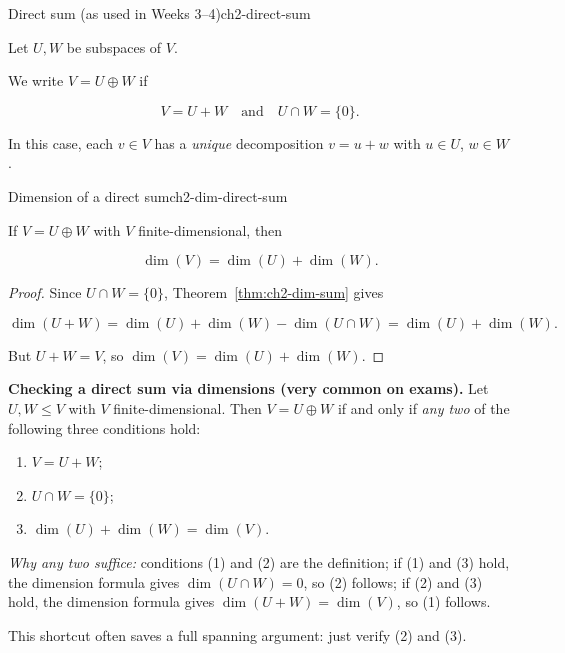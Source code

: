\begin{definition}{Direct sum (as used in Weeks 3--4)}{ch2-direct-sum}

Let $U,W$ be subspaces of $V$.

We write $V=U\oplus W$ if

\[
V=U+W
\quad\text{and}\quad
U\cap W=\{0\}.
\]

In this case, each $v\in V$ has a \emph{unique} decomposition $v=u+w$ with $u\in U$, $w\in W$.

\end{definition}

\begin{theorem}{Dimension of a direct sum}{ch2-dim-direct-sum}

If $V=U\oplus W$ with $V$ finite-dimensional, then

\[
\dim(V)=\dim(U)+\dim(W).
\]

\begin{proof}

Since $U\cap W=\{0\}$, Theorem~\ref{thm:ch2-dim-sum} gives

\[
\dim(U+W)=\dim(U)+\dim(W)-\dim(U\cap W)=\dim(U)+\dim(W).
\]

But $U+W=V$, so $\dim(V)=\dim(U)+\dim(W)$.

\end{proof}

\end{theorem}

\begin{keyformula}
\textbf{Checking a direct sum via dimensions (very common on exams).}
Let $U,W\le V$ with $V$ finite-dimensional.  Then $V=U\oplus W$ if and only if \emph{any two} of the following three conditions hold:
\begin{enumerate}[leftmargin=*]
\item $V=U+W$;
\item $U\cap W=\{0\}$;
\item $\dim(U)+\dim(W)=\dim(V)$.
\end{enumerate}
\emph{Why any two suffice:} conditions (1) and (2) are the definition; if (1) and (3) hold, the dimension formula gives $\dim(U\cap W)=0$, so (2) follows; if (2) and (3) hold, the dimension formula gives $\dim(U+W)=\dim(V)$, so (1) follows.

This shortcut often saves a full spanning argument: just verify (2) and (3).
\end{keyformula}

